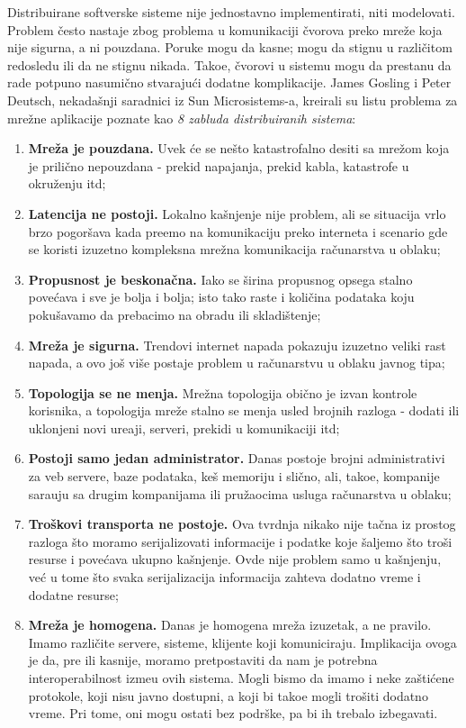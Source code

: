 Distribuirane softverske sisteme nije jednostavno implementirati, niti modelovati. Problem \v cesto nastaje zbog problema u komunikaciji \v cvorova preko mre\v ze koja nije sigurna, a ni pouzdana. Poruke mogu da kasne; mogu da stignu u razli\v citom redosledu ili da ne stignu nikada. Tako\dj e, \v cvorovi u sistemu mogu da prestanu da rade potpuno nasumi\v cno stvaraju\'ci dodatne komplikacije. James Gosling i Peter Deutsch, nekada\v snji saradnici iz Sun Microsistems-a, kreirali su listu problema za mre\v zne aplikacije poznate kao \textit{8 zabluda distribuiranih sistema}:

\begin{enumerate}[start=1,label={(\bfseries \arabic*)}]
	\item \textbf{Mre\v za je pouzdana.} Uvek \'ce se ne\v sto katastrofalno desiti sa mre\v zom koja je prili\v cno nepouzdana - prekid napajanja, prekid kabla, katastrofe u okru\v zenju itd;
	\item \textbf{Latencija ne postoji.} Lokalno ka\v snjenje nije problem, ali se situacija vrlo brzo pogor\v sava kada pre\dj emo na komunikaciju preko interneta i scenario gde se koristi izuzetno kompleksna mre\v zna komunikacija ra\v cunarstva u oblaku;
	\item \textbf{Propusnost je beskona\v cna.} Iako se \v sirina propusnog opsega stalno pove\'cava i sve je bolja i bolja; isto tako raste i koli\v cina podataka koju poku\v savamo da prebacimo na obradu ili skladi\v stenje;
	\item \textbf{Mre\v za je sigurna.} Trendovi internet napada pokazuju izuzetno veliki rast napada, a ovo jo\v s vi\v se postaje problem u ra\v cunarstvu u oblaku javnog tipa;
	\item \textbf{Topologija se ne menja.} Mre\v zna topologija obi\v cno je izvan kontrole korisnika, a topologija mre\v ze stalno se menja usled brojnih razloga - dodati ili uklonjeni novi ure\dj aji, serveri, prekidi u komunikaciji itd;
	\item \textbf{Postoji samo jedan administrator.} Danas postoje brojni administrativi za veb servere, baze podataka, ke\v s memoriju i sli\v cno, ali, tako\dj e, kompanije sara\dj uju sa drugim kompanijama ili pru\v zaocima usluga ra\v cunarstva u oblaku;
	\item \textbf{Tro\v skovi transporta ne postoje.} Ova tvrdnja nikako nije ta\v cna iz prostog razloga \v sto moramo serijalizovati informacije i podatke koje \v saljemo \v sto tro\v si resurse i pove\'cava ukupno ka\v snjenje. Ovde nije problem samo u ka\v snjenju, ve\'c u tome \v sto svaka serijalizacija informacija zahteva dodatno vreme i dodatne resurse;
	\item \textbf{Mre\v za je homogena.} Danas je homogena mre\v za izuzetak, a ne pravilo. Imamo razli\v cite servere, sisteme, klijente koji komuniciraju. Implikacija ovoga je da, pre ili kasnije, moramo pretpostaviti da nam je potrebna interoperabilnost izme\dj u ovih sistema. Mogli bismo da imamo i neke za\v sti\'cene protokole, koji nisu javno dostupni, a koji bi tako\dj e mogli tro\v siti dodatno vreme. Pri tome, oni mogu ostati bez podr\v ske, pa bi ih trebalo izbegavati.
\end{enumerate}

